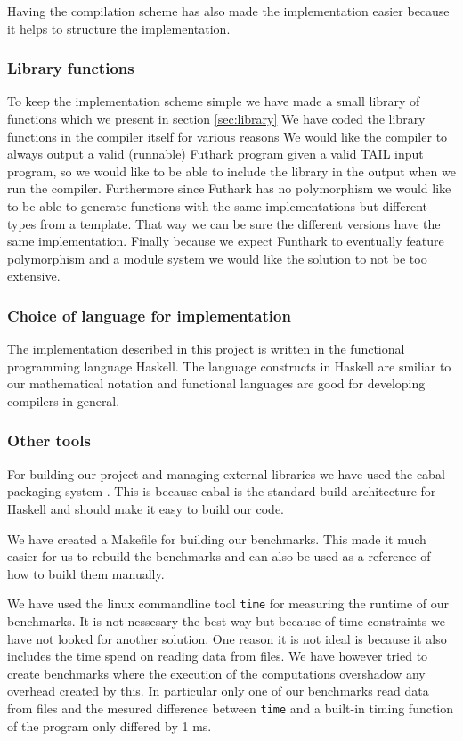 \documentclass[11pt]{article}
\begin{document}
Having the compilation scheme has also made the implementation easier because it helps to structure the implementation. 

\subsubsection{Library functions}
To keep the implementation scheme simple we have made a small library of functions which we present in section \ref{sec:library} 
We have coded the library functions in the compiler itself for various reasons
We would like the compiler to always output a valid (runnable) Futhark program given a valid TAIL input program, so we would like to
be able to include the library in the output when we run the compiler.
Furthermore since Futhark has no polymorphism we would like to be able to
generate functions with the same implementations but different types from a template.
That way we can be sure the different versions have the same implementation.
Finally because we expect Funthark to eventually feature polymorphism and a module system we would like the solution to not be too
extensive\cite{TroelsHenriksen}. 

\subsubsection{Choice of language for implementation}
The implementation described in this project is written in the functional programming language Haskell.
The language constructs in Haskell are smiliar to our mathematical notation and functional languages are good for developing compilers in general.\cite{TorbenMogensen}

\subsubsection{Other tools}
For building our project and managing external libraries we have used the cabal packaging system \cite{cabal}.
This is because cabal is the standard build architecture for Haskell and should make it easy to build our code.

We have created a Makefile for building our benchmarks. This made it much easier for us to rebuild the benchmarks and can also be used
as a reference of how to build them manually.

We have used the linux commandline tool {\tt time} for measuring the runtime of our benchmarks. 
It is not nessesary the best way but because of time constraints we have not looked for another solution.
One reason it is not ideal is because it also includes the time spend on reading data from files. We have however tried to create benchmarks where the execution of the computations overshadow any overhead created by this. In particular only one of our benchmarks read
data from files and the mesured difference between {\tt time} and a built-in timing function of the program only differed by 1 ms.
\end{document}
